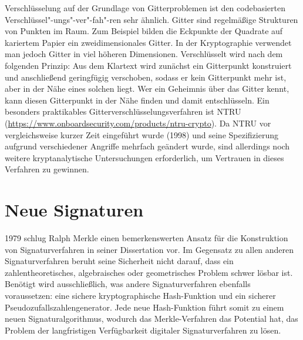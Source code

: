 \begin{refsegment}
Verschlüsselung auf der Grundlage von
Gitterproblemen ist den
codebasierten Verschlüssel"-ungs"-ver"-fah"-ren sehr ähnlich. Gitter sind
regelmäßige Strukturen von Punkten im Raum. Zum Beispiel bilden die
Eckpunkte der Quadrate auf kariertem Papier ein zweidimensionales
Gitter. In der Kryptographie verwendet man jedoch Gitter in viel höheren
Dimensionen. Verschlüsselt wird nach dem folgenden Prinzip: Aus dem
Klartext wird zunächst ein Gitterpunkt konstruiert und anschließend
geringfügig verschoben, sodass er kein Gitterpunkt mehr ist, aber in der
Nähe eines solchen liegt. Wer ein Geheimnis über das Gitter kennt, kann
diesen Gitterpunkt in der Nähe finden und damit entschlüsseln. Ein
besonders praktikables Gitterverschlüsselungsverfahren ist NTRU
(\url{https://www.onboardsecurity.com/products/ntru-crypto}).
Da NTRU vor vergleichsweise kurzer Zeit
eingeführt wurde (1998) und seine Spezifizierung aufgrund verschiedener
Angriffe mehrfach geändert wurde, sind allerdings noch weitere
kryptanalytische Untersuchungen erforderlich, um Vertrauen in dieses
Verfahren zu gewinnen.


\section{Neue Signaturen}
\label{sec:signaturen}

1979 schlug Ralph Merkle einen bemerkenswerten Ansatz für die
Konstruktion von Signaturverfahren in seiner Dissertation
\cite{merkle-thesis:1979} vor.  Im Gegensatz zu allen anderen
Signaturverfahren beruht seine Sicherheit
nicht darauf, dass ein
zahlentheoretisches, algebraisches oder geometrisches Problem schwer
lösbar ist. Benötigt wird ausschließlich, was andere Signaturverfahren
ebenfalls voraussetzen: eine sichere kryptographische Hash-Funktion und
ein sicherer Pseudozufallszahlengenerator. Jede neue Hash-Funktion führt
somit zu einem neuen Signaturalgorithmus, wodurch das Merkle-Verfahren
das Potential hat, das Problem der langfristigen Verfügbarkeit digitaler
Signaturverfahren zu lösen.


\end{refsegment}
